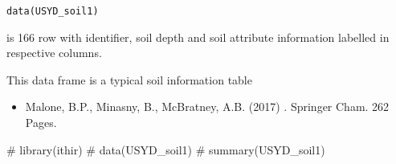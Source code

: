 \documentclass[a4paper]{book}
\begin{document}
%
\begin{Usage}
\begin{verbatim}
data(USYD_soil1)
\end{verbatim}
\end{Usage}
%
\begin{Format}
 is 166 row  with identifier, soil depth and soil attribute information labelled in respective columns. 
\end{Format}
%
\begin{Details}
This data frame is a typical soil information table
\end{Details}
%
\begin{References}
\begin{itemize}


\item{} Malone, B.P., Minasny, B., McBratney, A.B. (2017) . Springer Cham. 262 Pages.

\end{itemize}

\end{References}
%
\begin{Examples}
\begin{ExampleCode}

# library(ithir)
# data(USYD_soil1)
# summary(USYD_soil1)

\end{ExampleCode}
\end{Examples}
\printindex{}
\end{document}
